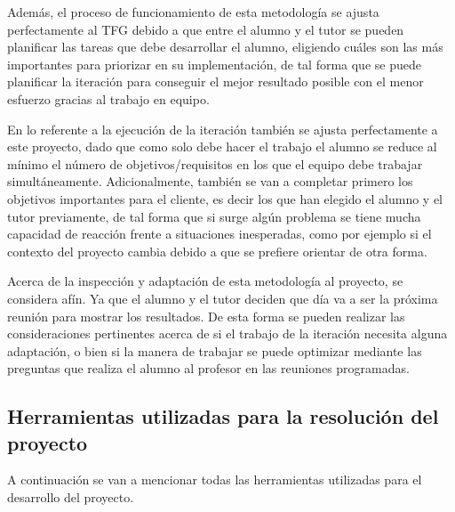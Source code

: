 Además, el proceso de funcionamiento de esta metodología se ajusta perfectamente al \ac{TFG} debido a que entre el alumno y el tutor se pueden planificar las tareas que debe desarrollar el alumno, eligiendo cuáles son las más importantes para priorizar en su implementación, de tal forma que se puede planificar la iteración para conseguir el mejor resultado posible con el menor esfuerzo gracias al trabajo en equipo.

En lo referente a la ejecución de la iteración también se ajusta perfectamente a este proyecto, dado que como solo debe hacer el trabajo el alumno se reduce al mínimo el número de objetivos/requisitos en los que el equipo debe trabajar simultáneamente. Adicionalmente, también se van a completar primero los objetivos importantes para el cliente, es decir los que han elegido el alumno y el tutor previamente, de tal forma que si surge algún problema se tiene mucha capacidad de reacción frente a situaciones inesperadas, como por ejemplo si el contexto del proyecto cambia debido a que se prefiere orientar de otra forma. 
 
Acerca de la inspección y adaptación de esta metodología al proyecto, se considera afín. Ya que el alumno y el tutor deciden que día va a ser la próxima reunión para mostrar los resultados. De esta forma se pueden realizar las consideraciones pertinentes acerca de si el trabajo de la iteración necesita alguna adaptación, o bien si la manera de trabajar se puede optimizar mediante las preguntas que realiza el alumno al profesor en las reuniones programadas.
 
\subsection{Herramientas utilizadas para la resolución del proyecto}

A continuación se van a mencionar todas las herramientas utilizadas para el desarrollo del proyecto.

